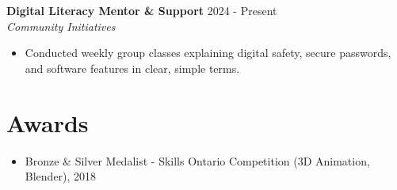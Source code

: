 \documentclass[a4paper,10pt]{article}
\begin{document}
\vspace{3pt}
\textbf{Digital Literacy Mentor \& Support} \hfill 2024 - Present \\
\textit{Community Initiatives}
\begin{itemize}
    \item Conducted weekly group classes explaining digital safety, secure passwords, and software features in clear, simple terms.
\end{itemize}

\section*{Awards}
\begin{itemize}
    \item Bronze \& Silver Medalist - Skills Ontario Competition (3D Animation, Blender), 2018
\end{itemize}
\end{document}

